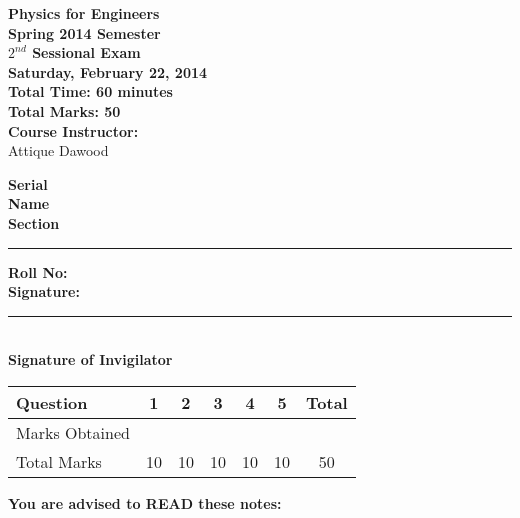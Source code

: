 \documentclass[12pt,a4paper]{article}
\def\QOne{10}
\def\Qtwo{10}
\def\Qthree{10}
\def\Qfour{10}
\def\Qfive{10}
\def\TotalMarks{50}
\begin{document}
\begin{minipage}{0.55\textwidth}
{\LARGE \textbf{Physics for Engineers}}\\[0.15cm]
{\normalsize \textbf{Spring 2014 Semester}}\\
{\Large \textbf{$2^{nd}$ Sessional Exam}}\\
{\normalsize \textbf{Saturday, February 22, 2014}}\\[0.30cm]
{\Large \textbf{Total Time: 60 minutes}}\\[0.15cm]
{\Large \textbf{Total Marks: 50}}\\
\textbf{Course Instructor:}\\
Attique Dawood\\
\end{minipage}
\begin{minipage}{0.4\textwidth}
\textbf{Serial} \hrulefill \\[0.25cm]
\textbf{Name} \hrulefill\\[0.25cm]
\textbf{Section} \rule{1cm}{0.2mm} \textbf{Roll No:} \hrulefill\\[0.25cm]
\textbf{Signature:} \hrulefill\\[0.25cm]
\rule{6.6cm}{0.2mm}\\
\textbf{Signature of Invigilator}\\[0.25cm]
\end{minipage}
\begin{table}[H]
\begin{center}
\vspace{0.3cm}
	{\large \begin{tabular}{|l|c|c|c|c|c|c|}
	\hline
		\rule{0pt}{2.6ex} Question & \textbf{1} & \textbf{2} & \textbf{3} & \textbf{4} & \textbf{5} & \textbf{Total}\\
		\hline
		Marks Obtained \rule{0pt}{2.6ex} & & & & & &\\
		\hline
		Total Marks \rule{0pt}{2.6ex} & \QOne & \Qtwo & \Qthree & \Qfour & \Qfive & \TotalMarks\\		
	\hline
	\end{tabular}}
\end{center}
\end{table}
\noindent \textbf{You are advised to READ these notes:}
\end{document}

